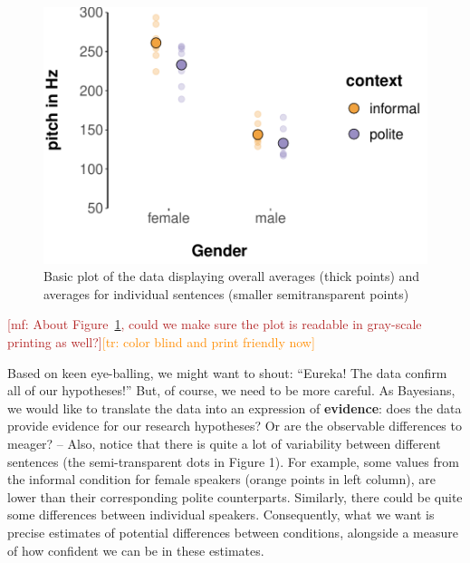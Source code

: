\documentclass[nobib]{tufte-handout}
\renewcommand{\mf}[1]{\textcolor{firebrick}{[mf: #1]}}
\newcommand{\tr}[1]{\textcolor{DarkOrange}{[tr: #1]}}
\begin{document}
\begin{figure}[t]
  \centering
    \includegraphics[width = \textwidth]{pics/basic_data_plot.pdf}
    \caption{Basic plot of the data displaying overall averages (thick points) and averages for individual sentences (smaller semitransparent points)}
     \label{fig:BasicPlotData_data}
\end{figure}

\mf{About Figure~\ref{fig:BasicPlotData_data}, could we make sure the plot is readable in
  gray-scale printing as well?}\tr{color blind and print friendly now}

Based on keen eye-balling, we might want to shout: ``Eureka! The data confirm all of our
hypotheses!'' But, of course, we need to be more careful. As Bayesians, we would like to
translate the data into an expression of \textbf{evidence}: does the data provide evidence for
our research hypotheses? Or are the observable differences to meager? -- Also, notice that
there is quite a lot of variability between different sentences (the semi-transparent dots in Figure 1).
For example, some values from the informal condition for female speakers (orange points in left
column), are lower than their corresponding polite counterparts. Similarly, there could be
quite some differences between individual speakers. Consequently, what we want is precise
estimates of potential differences between conditions, alongside a measure of how confident we can be in these estimates.
\end{document}
